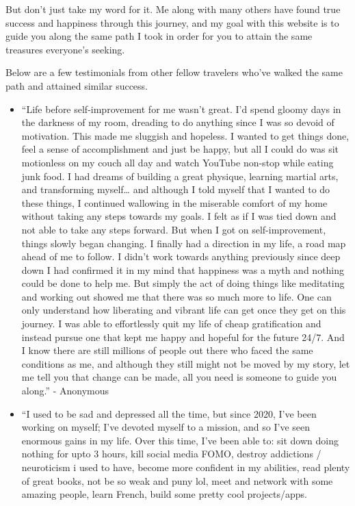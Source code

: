 \documentclass[
]{book}
\begin{document}
But don't just take my word for it. Me along with many others have found true success and happiness through this journey, and my goal with this website is to guide you along the same path I took in order for you to attain the same treasures everyone's seeking.

Below are a few testimonials from other fellow travelers who've walked the same path and attained similar success.

\begin{itemize}
\item
  ``Life before self-improvement for me wasn't great. I'd spend gloomy days in the darkness of my room, dreading to do anything since I was so devoid of motivation. This made me sluggish and hopeless. I wanted to get things done, feel a sense of accomplishment and just be happy, but all I could do was sit motionless on my couch all day and watch YouTube non-stop while eating junk food. I had dreams of building a great physique, learning martial arts, and transforming myself\ldots{} and although I told myself that I wanted to do these things, I continued wallowing in the miserable comfort of my home without taking any steps towards my goals. I felt as if I was tied down and not able to take any steps forward.
  But when I got on self-improvement, things slowly began changing. I finally had a direction in my life, a road map ahead of me to follow. I didn't work towards anything previously since deep down I had confirmed it in my mind that happiness was a myth and nothing could be done to help me. But simply the act of doing things like meditating and working out showed me that there was so much more to life. One can only understand how liberating and vibrant life can get once they get on this journey. I was able to effortlessly quit my life of cheap gratification and instead pursue one that kept me happy and hopeful for the future 24/7. And I know there are still millions of people out there who faced the same conditions as me, and although they still might not be moved by my story, let me tell you that change can be made, all you need is someone to guide you along.'' - Anonymous
\item
  ``I used to be sad and depressed all the time, but since 2020, I've been working on myself; I've devoted myself to a mission, and so I've seen enormous gains in my life. Over this time, I've been able to: sit down doing nothing for upto 3 hours, kill social media FOMO, destroy addictions / neuroticism i used to have, become more confident in my abilities, read plenty of great books, not be so weak and puny lol, meet and network with some amazing people, learn French, build some pretty cool projects/apps.

\end{itemize}
\end{document}
